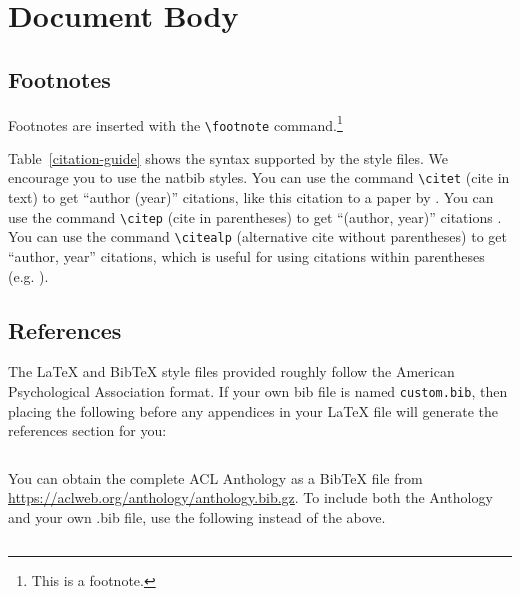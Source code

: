\documentclass[11pt]{article}
\begin{document}
\section{Document Body}

\subsection{Footnotes}

Footnotes are inserted with the \verb|\footnote| command.\footnote{This is a footnote.}



Table~\ref{citation-guide} shows the syntax supported by the style files.
We encourage you to use the natbib styles.
You can use the command \verb|\citet| (cite in text) to get ``author (year)'' citations, like this citation to a paper by \citet{Gusfield:97}.
You can use the command \verb|\citep| (cite in parentheses) to get ``(author, year)'' citations \citep{Gusfield:97}.
You can use the command \verb|\citealp| (alternative cite without parentheses) to get ``author, year'' citations, which is useful for using citations within parentheses (e.g. \citealp{Gusfield:97}).

\subsection{References}

\nocite{Ando2005,andrew2007scalable,rasooli-tetrault-2015}

The \LaTeX{} and Bib\TeX{} style files provided roughly follow the American Psychological Association format.
If your own bib file is named \texttt{custom.bib}, then placing the following before any appendices in your \LaTeX{} file will generate the references section for you:
\begin{quote}
  \begin{verbatim}

\end{verbatim}
\end{quote}

You can obtain the complete ACL Anthology as a Bib\TeX{} file from \url{https://aclweb.org/anthology/anthology.bib.gz}.
To include both the Anthology and your own .bib file, use the following instead of the above.
\begin{quote}
  \begin{verbatim}

\end{verbatim}
\end{quote}
\end{document}
